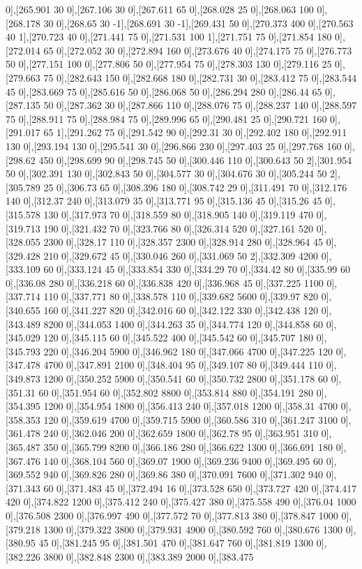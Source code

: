 {0],[265.901 30 0],[267.106 30 0],[267.611 65 0],[268.028 25 0],[268.063 100 0],[268.178 30 0],[268.65 30 -1],[268.691 30 -1],[269.431 50 0],[270.373 400 0],[270.563 40 1],[270.723 40 0],[271.441 75 0],[271.531 100 1],[271.751 75 0],[271.854 180 0],[272.014 65 0],[272.052 30 0],[272.894 160 0],[273.676 40 0],[274.175 75 0],[276.773 50 0],[277.151 100 0],[277.806 50 0],[277.954 75 0],[278.303 130 0],[279.116 25 0],[279.663 75 0],[282.643 150 0],[282.668 180 0],[282.731 30 0],[283.412 75 0],[283.544 45 0],[283.669 75 0],[285.616 50 0],[286.068 50 0],[286.294 280 0],[286.44 65 0],[287.135 50 0],[287.362 30 0],[287.866 110 0],[288.076 75 0],[288.237 140 0],[288.597 75 0],[288.911 75 0],[288.984 75 0],[289.996 65 0],[290.481 25 0],[290.721 160 0],[291.017 65 1],[291.262 75 0],[291.542 90 0],[292.31 30 0],[292.402 180 0],[292.911 130 0],[293.194 130 0],[295.541 30 0],[296.866 230 0],[297.403 25 0],[297.768 160 0],[298.62 450 0],[298.699 90 0],[298.745 50 0],[300.446 110 0],[300.643 50 2],[301.954 50 0],[302.391 130 0],[302.843 50 0],[304.577 30 0],[304.676 30 0],[305.244 50 2],[305.789 25 0],[306.73 65 0],[308.396 180 0],[308.742 29 0],[311.491 70 0],[312.176 140 0],[312.37 240 0],[313.079 35 0],[313.771 95 0],[315.136 45 0],[315.26 45 0],[315.578 130 0],[317.973 70 0],[318.559 80 0],[318.905 140 0],[319.119 470 0],[319.713 190 0],[321.432 70 0],[323.766 80 0],[326.314 520 0],[327.161 520 0],[328.055 2300 0],[328.17 110 0],[328.357 2300 0],[328.914 280 0],[328.964 45 0],[329.428 210 0],[329.672 45 0],[330.046 260 0],[331.069 50 2],[332.309 4200 0],[333.109 60 0],[333.124 45 0],[333.854 330 0],[334.29 70 0],[334.42 80 0],[335.99 60 0],[336.08 280 0],[336.218 60 0],[336.838 420 0],[336.968 45 0],[337.225 1100 0],[337.714 110 0],[337.771 80 0],[338.578 110 0],[339.682 5600 0],[339.97 820 0],[340.655 160 0],[341.227 820 0],[342.016 60 0],[342.122 330 0],[342.438 120 0],[343.489 8200 0],[344.053 1400 0],[344.263 35 0],[344.774 120 0],[344.858 60 0],[345.029 120 0],[345.115 60 0],[345.522 400 0],[345.542 60 0],[345.707 180 0],[345.793 220 0],[346.204 5900 0],[346.962 180 0],[347.066 4700 0],[347.225 120 0],[347.478 4700 0],[347.891 2100 0],[348.404 95 0],[349.107 80 0],[349.444 110 0],[349.873 1200 0],[350.252 5900 0],[350.541 60 0],[350.732 2800 0],[351.178 60 0],[351.31 60 0],[351.954 60 0],[352.802 8800 0],[353.814 880 0],[354.191 280 0],[354.395 1200 0],[354.954 1800 0],[356.413 240 0],[357.018 1200 0],[358.31 4700 0],[358.353 120 0],[359.619 4700 0],[359.715 5900 0],[360.586 310 0],[361.247 3100 0],[361.478 240 0],[362.046 200 0],[362.659 1800 0],[362.78 95 0],[363.951 310 0],[365.487 350 0],[365.799 8200 0],[366.186 280 0],[366.622 1300 0],[366.691 180 0],[367.476 140 0],[368.104 560 0],[369.07 1900 0],[369.236 9400 0],[369.495 60 0],[369.552 940 0],[369.826 280 0],[369.86 380 0],[370.091 7600 0],[371.302 940 0],[371.343 60 0],[371.483 45 0],[372.494 16 0],[373.528 650 0],[373.727 420 0],[374.417 420 0],[374.822 1200 0],[375.412 240 0],[375.427 380 0],[375.558 490 0],[376.04 1000 0],[376.508 2300 0],[376.997 490 0],[377.572 70 0],[377.813 380 0],[378.847 1000 0],[379.218 1300 0],[379.322 3800 0],[379.931 4900 0],[380.592 760 0],[380.676 1300 0],[380.95 45 0],[381.245 95 0],[381.501 470 0],[381.647 760 0],[381.819 1300 0],[382.226 3800 0],[382.848 2300 0],[383.389 2000 0],[383.475 }
